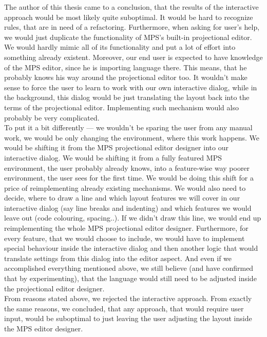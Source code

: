 The author of this thesis came to a conclusion, that the results of the interactive approach would be most likely quite suboptimal.
It would be hard to recognize rules, that are in need of a refactoring.
Furthermore, when asking for user's help, we would just duplicate the functionality of MPS's built-in projectional editor.
We would hardly mimic all of its functionality and put a lot of effort into something already existent.
Moreover, our end user is expected to have knowledge of the MPS editor, since he is importing language there.
This means, that he probably knows his way around the projectional editor too.
It wouldn't make sense to force the user to learn to work with our own interactive dialog, while in the background, this dialog would be just translating the layout back into the terms of the projectional editor.
Implementing such mechanism would also probably be very complicated.
\\

To put it a bit differently --- we wouldn't be sparing the user from any manual work, we would be only changing the environment, where this work happens.
We would be shifting it from the MPS projectional editor designer into our interactive dialog.
We would be shifting it from a fully featured MPS environment, the user probably already knows, into a feature-wise way poorer environment, the user sees for the first time.
We would be doing this shift for a price of reimplementing already existing mechanisms.
We would also need to decide, where to draw a line and which layout features we will cover in our interactive dialog (say line breaks and indenting) and which features we would leave out (code colouring, spacing..).
If we didn't draw this line, we would end up reimplementing the whole MPS projectional editor designer.
Furthermore, for every feature, that we would choose to include, we would have to implement special behaviour inside the interactive dialog and then another logic that would translate settings from this dialog into the editor aspect.
And even if we accomplished everything mentioned above, we still believe (and have confirmed that by experimenting), that the language would still need to be adjusted inside the projectional editor designer.
\\

From reasons stated above, we rejected the interactive approach.
From exactly the same reasons, we concluded, that any approach, that would require user input, would be suboptimal to just leaving the user adjusting the layout inside the MPS editor designer. 

